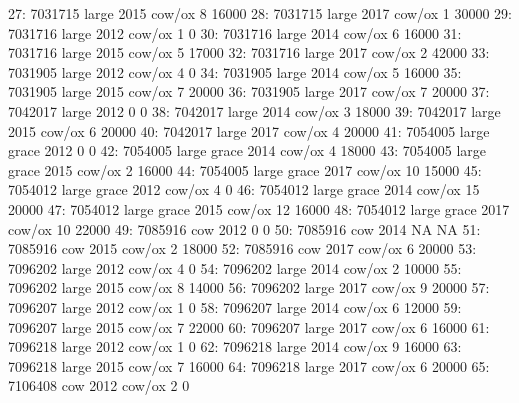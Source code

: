 \begin{Schunk}
\begin{Soutput}
27: 7031715       large 2015        cow/ox            8      16000
28: 7031715       large 2017        cow/ox            1      30000
29: 7031716       large 2012        cow/ox            1          0
30: 7031716       large 2014        cow/ox            6      16000
31: 7031716       large 2015        cow/ox            5      17000
32: 7031716       large 2017        cow/ox            2      42000
33: 7031905       large 2012        cow/ox            4          0
34: 7031905       large 2014        cow/ox            5      16000
35: 7031905       large 2015        cow/ox            7      20000
36: 7031905       large 2017        cow/ox            7      20000
37: 7042017       large 2012                          0          0
38: 7042017       large 2014        cow/ox            3      18000
39: 7042017       large 2015        cow/ox            6      20000
40: 7042017       large 2017        cow/ox            4      20000
41: 7054005 large grace 2012                          0          0
42: 7054005 large grace 2014        cow/ox            4      18000
43: 7054005 large grace 2015        cow/ox            2      16000
44: 7054005 large grace 2017        cow/ox           10      15000
45: 7054012 large grace 2012        cow/ox            4          0
46: 7054012 large grace 2014        cow/ox           15      20000
47: 7054012 large grace 2015        cow/ox           12      16000
48: 7054012 large grace 2017        cow/ox           10      22000
49: 7085916         cow 2012                          0          0
50: 7085916         cow 2014                         NA         NA
51: 7085916         cow 2015        cow/ox            2      18000
52: 7085916         cow 2017        cow/ox            6      20000
53: 7096202       large 2012        cow/ox            4          0
54: 7096202       large 2014        cow/ox            2      10000
55: 7096202       large 2015        cow/ox            8      14000
56: 7096202       large 2017        cow/ox            9      20000
57: 7096207       large 2012        cow/ox            1          0
58: 7096207       large 2014        cow/ox            6      12000
59: 7096207       large 2015        cow/ox            7      22000
60: 7096207       large 2017        cow/ox            6      16000
61: 7096218       large 2012        cow/ox            1          0
62: 7096218       large 2014        cow/ox            9      16000
63: 7096218       large 2015        cow/ox            7      16000
64: 7096218       large 2017        cow/ox            6      20000
65: 7106408         cow 2012        cow/ox            2          0

\end{Soutput}
\end{Schunk}
